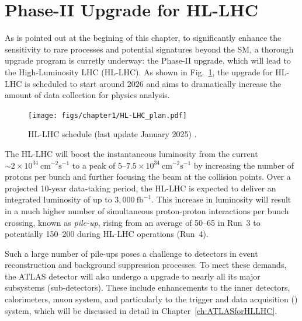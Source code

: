 \section{Phase-II Upgrade for HL-LHC} \label{sec:upgrade}
As is pointed out at the begining of this chapter, to significantly enhance the sensitivity to rare processes and potential signatures beyond the SM, a thorough upgrade program is curretly underway: the Phase-II upgrade, which will lead to the High-Luminosity LHC (HL-LHC). As shown in Fig.~\ref{fig:HL-LHC}, the upgrade for HL-LHC is scheduled to start around 2026 and aims to dramatically increase the amount of data collection for physics analysis.

\begin{figure}[htbp]
  \centering
  \texttt{[image: figs/chapter1/HL-LHC\_plan.pdf]}
  \caption{HL-LHC schedule (last update January 2025) \cite{HL-LHC}.}
  \label{fig:HL-LHC}
\end{figure}

The HL-LHC will boost the instantaneous luminosity from the current $\sim 2 \times 10^{34}~\mathrm{cm}^{-2}\mathrm{s}^{-1}$ to a peak of $5$–$7.5 \times 10^{34}~\mathrm{cm}^{-2}\mathrm{s}^{-1}$ by increasing the number of protons per bunch and further focusing the beam at the collision points. Over a projected 10-year data-taking period, the HL-LHC is expected to deliver an integrated luminosity of up to $3,000~\mathrm{fb}^{-1}$. This increase in luminosity will result in a much higher number of simultaneous proton-proton interactions per bunch crossing, known as \textit{pile-up}, rising from an average of 50–65 in Run~3 to potentially 150–200 during HL-LHC operations (Run~4).

Such a large number of pile-ups poses a challenge to detectors in event reconstruction and background suppression processes. To meet these demands, the ATLAS detector will also undergo a upgrade to nearly all its major subsystems (sub-detectors). These include enhancements to the inner detectors, calorimeters, muon system, and particularly to the trigger and data acquisition (\TDAQ) system, which will be discussed in detail in Chapter~\ref{ch:ATLASforHLLHC}.

